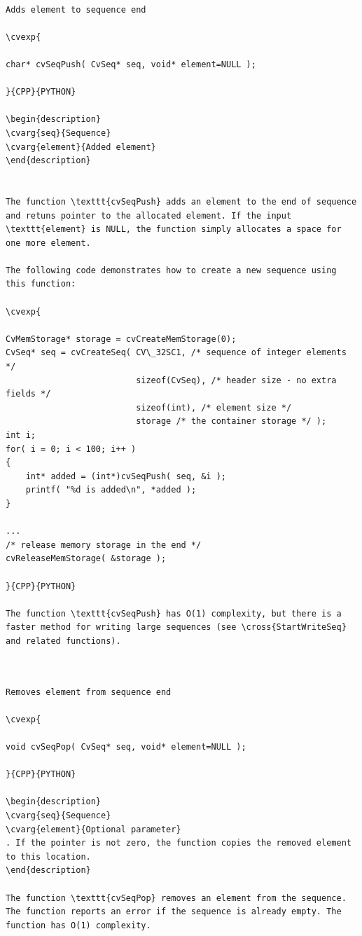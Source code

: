 \begin{verbatim}

Adds element to sequence end

\cvexp{

char* cvSeqPush( CvSeq* seq, void* element=NULL );

}{CPP}{PYTHON}

\begin{description}
\cvarg{seq}{Sequence}
\cvarg{element}{Added element}
\end{description}


The function \texttt{cvSeqPush} adds an element to the end of sequence and retuns pointer to the allocated element. If the input \texttt{element} is NULL, the function simply allocates a space for one more element.

The following code demonstrates how to create a new sequence using this function:

\cvexp{

CvMemStorage* storage = cvCreateMemStorage(0);
CvSeq* seq = cvCreateSeq( CV\_32SC1, /* sequence of integer elements */
                          sizeof(CvSeq), /* header size - no extra fields */
                          sizeof(int), /* element size */
                          storage /* the container storage */ );
int i;
for( i = 0; i < 100; i++ )
{
    int* added = (int*)cvSeqPush( seq, &i );
    printf( "%d is added\n", *added );
}

...
/* release memory storage in the end */
cvReleaseMemStorage( &storage );

}{CPP}{PYTHON}

The function \texttt{cvSeqPush} has O(1) complexity, but there is a faster method for writing large sequences (see \cross{StartWriteSeq} and related functions).


\end{verbatim}
\label{SeqPop}
\begin{verbatim}

Removes element from sequence end

\cvexp{

void cvSeqPop( CvSeq* seq, void* element=NULL );

}{CPP}{PYTHON}

\begin{description}
\cvarg{seq}{Sequence}
\cvarg{element}{Optional parameter}
. If the pointer is not zero, the function copies the removed element to this location.
\end{description}

The function \texttt{cvSeqPop} removes an element from the sequence. The function reports an error if the sequence is already empty. The function has O(1) complexity.


\end{verbatim}
